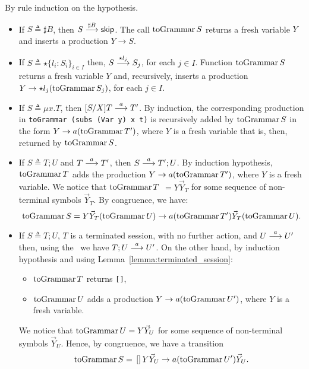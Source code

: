 \begin{itemizeproof}
By rule induction on the hypothesis.
\begin{itemize}
\item If $S\triangleq \sharp B$, then
  $S \LTSderives[\sharp B] \skipk$. The call $\toGrammarf S$
  returns a fresh variable $Y$ and inserts a production
  $Y\rightarrow S$.
\item If $S\triangleq \star\{l_i\colon S_i\}_{i\in I}$ then,
  $S \LTSderives[\star l_j] S_j$, for each $j\in I$. Function
  $\toGrammarf S$ returns a fresh variable $Y$ and, recursively,
  inserts a production $Y\rightarrow \star l_j (\toGrammarf{S_j})$,
  for each $j\in I$.
\item If $S\triangleq \mu x.T$, then $\subs SXT \LTSderives T'$.
  By induction, the corresponding production in
  \lstinline{toGrammar (subs (Var y) x t)} is recursively added by
  $\toGrammarf S$ in the form $Y \rightarrow a (\toGrammarf{T'})$,
  where $Y$ is a fresh variable that is, then, returned by
  $\toGrammarf S$.
\item If $S\triangleq T;U$ and $T \LTSderives[a] T'$, then
  $S \LTSderives[a] T';U$.  By induction hypothesis, $\toGrammarf T$
  adds the production $Y\rightarrow a (\toGrammarf{T'})$, where $Y$
  is a fresh variable.  We notice that $\toGrammarf T$
  $= Y \vec Y_T$ for some sequence of non-terminal symbols
  $\vec Y_T$. By congruence, we have:
  \[\toGrammarf S = Y\vec Y_T(\toGrammarf U)
    \rightarrow a(\toGrammarf T')\vec Y_T(\toGrammarf U)
    .\]
\item If $S\triangleq T;U$, $T$ is a terminated session, with no further
  action, and $U \LTSderives[a] U'$ then, using the \LTS\ we have
  $T;U \LTSderives[a] U'$. On the other hand, by induction hypothesis and
  using Lemma~\ref{lemma:terminated_session}:
  \begin{itemize}
  \item $\toGrammarf T$  returns \lstinline{[]},
  \item $\toGrammarf U$ adds a production
    $Y \rightarrow a (\toGrammarf U')$, where $Y$ is a fresh
    variable.
  \end{itemize}
  We notice that $\toGrammarf U = Y\vec Y_U$ for some sequence of
  non-terminal symbols $\vec Y_U$. Hence, by congruence, we have a
  transition
  \[\toGrammarf S = \text{\lstinline{[]}} Y
    \vec Y_U \rightarrow a (\toGrammarf{U')} \vec Y_U.\]
\end{itemize}
\end{itemizeproof}

